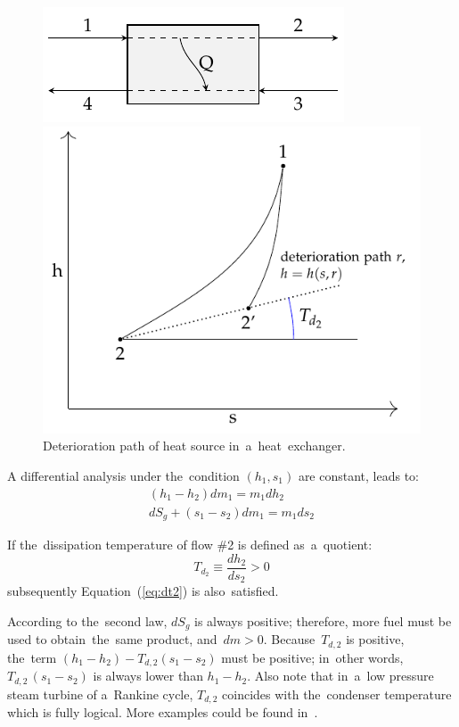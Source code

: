 \documentclass[energies,article,accept,moreauthors,pdftex]{Definitions/mdpi}
\begin{document}
\begin{figure}[H]
\centering
	\begin{minipage}[c]{0.35\linewidth}
		\centering
		\includegraphics{heater}
	\end{minipage}
	\hskip0.9cm
	\begin{minipage}[c]{0.45\linewidth}
		\centering
		\includegraphics[scale=0.7]{dt2}
	\end{minipage}
	\caption{Deterioration path of heat source in~a~heat~exchanger.}
	\label{fig:dt2}
\end{figure}
A differential analysis under the~condition $(h_1,s_1)$ are constant, leads to:
\begin{align}
\left(h_1 - h_2\right) dm_1 = m_1 dh_2 \\
dS_g + \left(s_1 - s_2\right) dm_1 =  m_1 ds_2
\end{align}

If the~dissipation temperature of flow \#2 is defined as~a~quotient:
\[
	T_{d_2}\equiv \frac{dh_2}{ds_2}>0
\]
subsequently Equation~(\ref{eq:dt2}) is also~satisfied.

According to the~second law, $dS_g$ is always positive; therefore, more fuel must be used to obtain~the~same product, and~$dm > 0$. Because~$T_{d,2}$ is positive, the~term $(h_1-h_2 )-T_{d,2} (s_1-s_2 )$ must be positive; in~other words, $T_{d,2}\,(s_1-s_2)$ is always lower than $h_1-h_2$. Also note that in~a~low pressure steam turbine of a~Rankine cycle, $T_{d,2}$ coincides with the~condenser temperature which is fully logical. More examples could be found in~\cite{Royo1995}.
\end{document}
